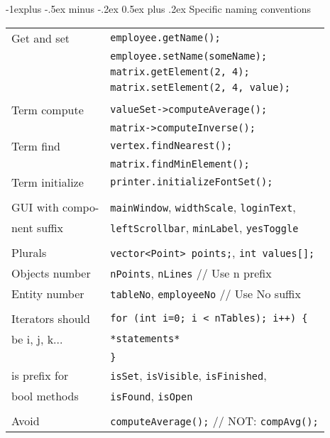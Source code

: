 \documentclass[10pt,landscape]{article}
\makeatletter
\renewcommand{\subsection}{\@startsection{subsection}{2}{0mm}%
                                {-1explus -.5ex minus -.2ex}%
                                {0.5ex plus .2ex}%
                                {\normalfont\normalsize\bfseries}}
\makeatother
\begin{document}
\begin{multicols}{3}
\subsection{Specific naming conventions}
\begin{tabular}{@{}ll@{}}
	Get and set     & \verb!employee.getName();! \\
	                & \verb!employee.setName(someName);! \\
	                & \verb!matrix.getElement(2, 4);! \\
	                & \verb!matrix.setElement(2, 4, value);! \\
	                & \\
	Term compute    & \verb!valueSet->computeAverage();! \\
	                & \verb!matrix->computeInverse();! \\
	Term find       & \verb!vertex.findNearest();! \\
	                & \verb!matrix.findMinElement();! \\
	Term initialize & \verb!printer.initializeFontSet();! \\
	                & \\
	GUI with compo- & \verb!mainWindow!, \verb!widthScale!, \verb!loginText!, \\
	nent suffix     & \verb!leftScrollbar!, \verb!minLabel!, \verb!yesToggle! \\
	                & \\
	Plurals         & \verb!vector<Point> points;!, \verb!int values[];! \\
	Objects number  & \verb!nPoints!, \verb!nLines! // Use n prefix\\
	Entity number   & \verb!tableNo!, \verb!employeeNo! // Use No suffix\\
	                & \\
	Iterators should& \verb!for (int i=0; i < nTables); i++) {!\\ 
	be i, j, k...   & \hspace{0.5cm} \verb!*statements*! \\
	                & \verb!}!\\
	is prefix for   & \verb!isSet!, \verb!isVisible!, \verb!isFinished!, \\
	bool methods    & \verb!isFound!, \verb!isOpen! \\
	                & \\
	Avoid           & \verb!computeAverage();! // NOT: \verb!compAvg();! \\

\end{tabular}
\end{multicols}
\end{document}
